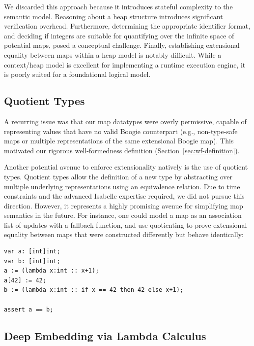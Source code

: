 We discarded this approach because it introduces stateful complexity to the semantic model.
Reasoning about a heap structure introduces significant verification overhead.
Furthermore, determining the appropriate identifier format, and deciding if integers are suitable for quantifying over the infinite space of potential maps, posed a conceptual challenge.
Finally, establishing extensional equality between maps within a heap model is notably difficult.
While a context/heap model is excellent for implementing a runtime execution engine, it is poorly suited for a foundational logical model.

\subsection{Quotient Types}

A recurring issue was that our map datatypes were overly permissive, capable of representing values that have no valid Boogie counterpart
(e.g., non-type-safe maps or multiple representations of the same extensional Boogie map).
This motivated our rigorous well-formedness definition (Section~\ref{sec:wf-definition}).

Another potential avenue to enforce extensionality natively is the use of quotient types. \cite{huffman2013lifting}
Quotient types allow the definition of a new type by abstracting over multiple underlying representations using an equivalence relation.
Due to time constraints and the advanced Isabelle expertise required, we did not pursue this direction.
However, it represents a highly promising avenue for simplifying map semantics in the future.
For instance, one could model a map as an association list of updates with a fallback function,
and use quotienting to prove extensional equality between maps that were constructed differently but behave identically:

\begin{lstlisting}[caption={Two equivalent maps, built different}]
var a: [int]int;
var b: [int]int;
a := (lambda x:int :: x+1);
a[42] := 42;
b := (lambda x:int :: if x == 42 then 42 else x+1);

assert a == b;
\end{lstlisting}

\subsection{Deep Embedding via Lambda Calculus}

